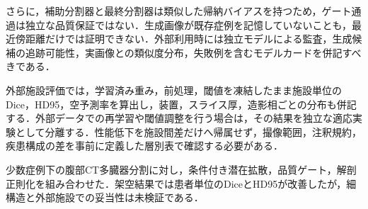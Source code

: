 さらに，補助分割器と最終分割器は類似した帰納バイアスを持つため，ゲート通過は独立な品質保証ではない．生成画像が既存症例を記憶していないことも，最近傍距離だけでは証明できない．外部利用時には独立モデルによる監査，生成候補の追跡可能性，実画像との類似度分布，失敗例を含むモデルカードを併記すべきである．

外部施設評価では，学習済み重み，前処理，閾値を凍結したまま施設単位のDice，HD95，空予測率を算出し，装置，スライス厚，造影相ごとの分布も併記する．外部データでの再学習や閾値調整を行う場合は，その結果を独立な適応実験として分離する．性能低下を施設間差だけへ帰属せず，撮像範囲，注釈規約，疾患構成の差を事前に定義した層別表で確認する必要がある．

少数症例下の腹部CT多臓器分割に対し，条件付き潜在拡散，品質ゲート，解剖正則化を組み合わせた．架空結果では患者単位のDiceとHD95が改善したが，細構造と外部施設での妥当性は未検証である．
